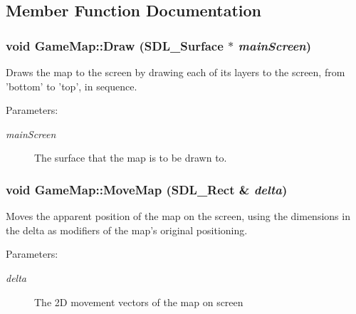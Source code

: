 \subsection{Member Function Documentation}
\hypertarget{class_game_map_bde2fbb121a24223a62ab45e3366b4e3}{
\subsubsection[{Draw}]{\setlength{\rightskip}{0pt plus 5cm}void GameMap::Draw (SDL\_\-Surface $\ast$ {\em mainScreen})}}
\label{d4/de2/class_game_map_bde2fbb121a24223a62ab45e3366b4e3}


Draws the map to the screen by drawing each of its layers to the screen, from 'bottom' to 'top', in sequence.

\begin{Desc}
\item[Parameters:]
\begin{description}
\item[{\em mainScreen}]The surface that the map is to be drawn to. \end{description}
\end{Desc}
\hypertarget{class_game_map_f353eaa95b9b0f7744ad8aa6a6d31158}{
\subsubsection[{MoveMap}]{\setlength{\rightskip}{0pt plus 5cm}void GameMap::MoveMap (SDL\_\-Rect \& {\em delta})}}
\label{d4/de2/class_game_map_f353eaa95b9b0f7744ad8aa6a6d31158}


Moves the apparent position of the map on the screen, using the dimensions in the delta as modifiers of the map's original positioning.

\begin{Desc}
\item[Parameters:]
\begin{description}
\item[{\em delta}]The 2D movement vectors of the map on screen \end{description}
\end{Desc}
